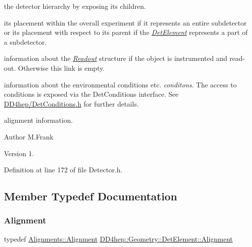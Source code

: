 \begin{DoxyItemize}
\item the detector hierarchy by exposing its children.
\item its placement within the overall experiment if it represents an entire subdetector or its placement with respect to its parent if the {\itshape \hyperlink{class_d_d4hep_1_1_geometry_1_1_det_element}{Det\+Element}} represents a part of a subdetector.
\item information about the {\itshape \hyperlink{class_d_d4hep_1_1_geometry_1_1_readout}{Readout}} structure if the object is instrumented and read-\/out. Otherwise this link is empty.
\item information about the environmental conditions etc. {\itshape conditons}. The access to conditions is exposed via the Det\+Conditions interface. See \hyperlink{_det_conditions_8h}{D\+D4hep/\+Det\+Conditions.\+h} for further details.
\item alignment information.
\end{DoxyItemize}\begin{DoxyAuthor}{Author}
M.\+Frank 
\end{DoxyAuthor}
\begin{DoxyVersion}{Version}
1. 
\end{DoxyVersion}


Definition at line 172 of file Detector.\+h.



\subsection{Member Typedef Documentation}
\hypertarget{class_d_d4hep_1_1_geometry_1_1_det_element_a5e5bddb6f1ba24c21af381b9bfeb3dba}{}\label{class_d_d4hep_1_1_geometry_1_1_det_element_a5e5bddb6f1ba24c21af381b9bfeb3dba} 
\subsubsection{\texorpdfstring{Alignment}{Alignment}}
{\footnotesize\ttfamily typedef \hyperlink{class_d_d4hep_1_1_alignments_1_1_alignment}{Alignments\+::\+Alignment} \hyperlink{class_d_d4hep_1_1_geometry_1_1_det_element_a5e5bddb6f1ba24c21af381b9bfeb3dba}{D\+D4hep\+::\+Geometry\+::\+Det\+Element\+::\+Alignment}}



